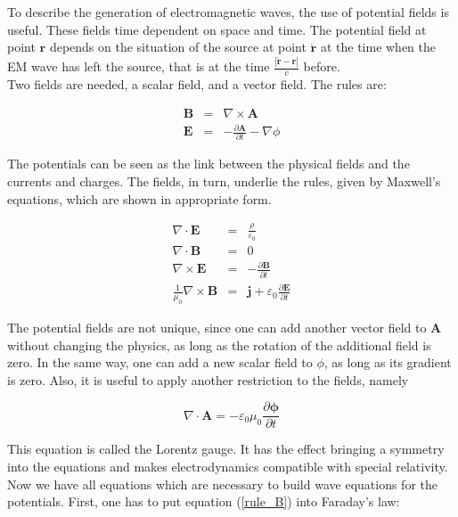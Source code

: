 \documentclass[a4paper,11pt]{report}
\begin{document}
To describe the generation of electromagnetic waves, the use of potential fields is useful. These fields time dependent on space and time. The potential field at point $\mathbf{r}$ depends on the situation of the source at point $\mathbf{\acute{r}}$ at the time when the EM wave has left the source, that is at the time $\frac{|\mathbf{\acute{r}}-\mathbf{r}|}{c}$ before. \\

Two fields are needed, a scalar field, and a vector field. The rules are:

\begin{eqnarray}
\mathbf{B}&=&\nabla \times \mathbf{A} \label{rule_B}\\
\mathbf{E}&=&-\frac{\partial \mathbf{A}}{\partial t}-\nabla \phi \label{rule_E}
\end{eqnarray}

The potentials can be seen as the link between the physical fields and the currents and charges. The  fields, in turn, underlie the rules, given by Maxwell's equations, which are shown in appropriate form.

\begin{eqnarray}
\nabla \cdot \mathbf{E}&=&\frac{\rho}{\varepsilon_0}\label{maxwell1}\\
\nabla \cdot \mathbf{B}&=&0\label{maxwell2}\\
\nabla \times \mathbf{E}&=&-\frac{\partial \mathbf{B}}{\partial t}\label{maxwell3}\\
\frac{1}{\mu_0}\nabla \times \mathbf{B}&=&\mathbf{j}+\varepsilon_0 \frac{\partial \mathbf{E}}{\partial t}\label{maxwell4}
\end{eqnarray}

The potential fields are not unique, since one can add another vector field to \textbf{A} without changing the physics, as long as the rotation of the additional field is zero. In the same way, one can add a new scalar field to $\phi$, as long as its gradient is zero. Also, it is useful to apply another restriction to the fields, namely

\begin{equation}\label{lorenz}
\nabla \cdot \mathbf{A}=-\varepsilon_0 \mu_0\frac{\partial \mathbf{\phi}}{\partial t}
\end{equation}


This equation is called the Lorentz gauge. It has the effect bringing a symmetry into the equations and makes electrodynamics compatible with special relativity. Now we have all equations which are necessary to build wave equations for the potentials. First, one has to put equation (\ref{rule_B}) into Faraday's law:
\end{document}
